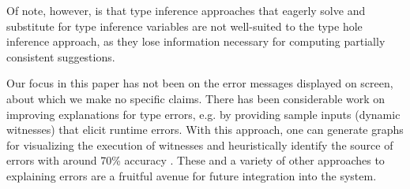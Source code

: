 Of note, however, is that type inference approaches that eagerly solve and substitute for type inference variables \cite{DBLP:journals/tapos/OderskySW99,DBLP:conf/icfp/Pottier14,mcadam1998unification} are not well-suited to the type hole inference approach, as they lose information necessary for computing partially consistent suggestions. 




Our focus in this paper has not been on the error messages displayed on screen, about which we make no specific claims. There has been considerable work on improving explanations for type errors, e.g. by providing sample inputs (dynamic witnesses) that elicit runtime errors. With this approach, one can generate graphs for visualizing the execution of witnesses and heuristically identify the source of errors with around 70\% accuracy \cite{Seidel2016}.
These and a variety of other approaches to explaining errors are a fruitful avenue for future integration into the system.


